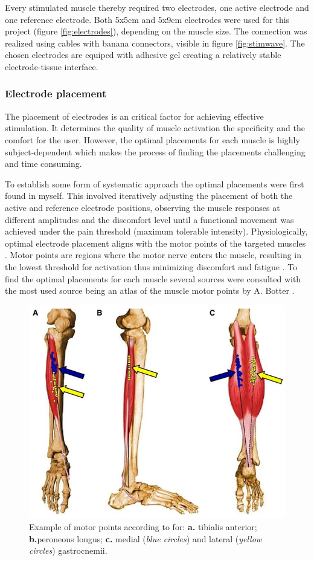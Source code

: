 Every stimulated muscle thereby required two electrodes, one active electrode and one reference electrode. Both 5x5cm and 5x9cm electrodes were used for this project (figure \ref{fig:electrodes}), depending on the muscle size. The connection was realized using cables with banana connectors, visible in figure \ref{fig:stimwave}. The chosen electrodes are equiped with adhesive gel creating a relatively stable electrode-tissue interface. 

\subsubsection{Electrode placement}
The placement of electrodes is an critical factor for achieving effective stimulation. It determines the quality of muscle activation the specificity and the comfort for the user. However, the optimal placements for each muscle is highly subject-dependent which makes the process of finding the placements challenging and time consuming.

To establish some form of systematic approach the optimal placements were first found in myself. This involved iteratively adjusting the placement of both the active and reference electrode positions, observing the muscle responses at different amplitudes and the discomfort level until a functional movement was achieved under the pain threshold (maximum tolerable intensity). Physiologically, optimal electrode placement aligns with the motor points of the targeted muscles . Motor points are regions where the motor nerve enters the muscle, resulting in the lowest threshold for activation thus minimizing discomfort and fatigue . To find the optimal placements for each muscle several sources were consulted with the most used source being an atlas of the muscle motor points by A. Botter \cite{botter_atlas_2011}. 

\begin{figure}
    \centering
    \includegraphics[width=0.6\linewidth]{images/screenshotmotorpoint.png}
    \caption{Example of motor points according to \cite{botter_atlas_2011} for: \textbf{a.} tibialis anterior; \textbf{b.}peroneous longus; \textbf{c.} medial (\textit{blue circles}) and lateral (\textit{yellow circles}) gastrocnemii. }
    \label{fig:motor-points}
\end{figure}

